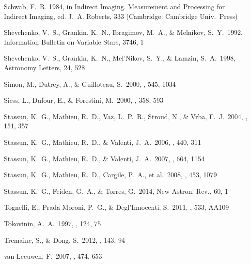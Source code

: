 \documentclass{aastex6}
\begin{document}
\begin{thebibliography}{}
{Schwab}, F.~R. 1984, in {Indirect Imaging. Measurement and Processing for
  Indirect Imaging}, ed. J.~A. {Roberts}, 333 (Cambridge: Cambridge Univ.~Press)

 Shevchenko, V.~S., 
Grankin, K.~N., Ibragimov, M.~A., 
\& Melnikov, S.~Y.\ 1992, Information Bulletin on Variable Stars, 3746, 1 

 Shevchenko, V.~S., 
Grankin, K.~N., Mel'Nikov, S.~Y., 
\& Lamzin, S.~A.\ 1998, Astronomy Letters, 24, 528 


 Simon, M., Dutrey, A., \& Guilloteau, S.\ 2000, \apj, 545, 1034

 Siess, L., Dufour, E., \& Forestini, M.\ 2000, \aap, 358, 593 

 Stassun, K.~G., 
Mathieu, R.~D., Vaz, L.~P.~R., Stroud, N., 
\& Vrba, F.~J.\ 2004, \apjs, 151, 357 

 Stassun, K.~G., 
Mathieu, R.~D., \& Valenti, J.~A.\ 2006, \nat, 440, 311 

 Stassun, K.~G., 
Mathieu, R.~D., \& Valenti, J.~A.\ 2007, \apj, 664, 1154

 Stassun, K.~G., 
Mathieu, R.~D., Cargile, P.~A., et al.\ 2008, \nat, 453, 1079 

Stassun, K.~G., Feiden, G.~A., \& Torres, G.\ 2014, New Astron. Rev., 60, 1

 Tognelli, E., Prada Moroni, P.~G., \& Degl'Innocenti, S.\ 2011, \aap, 533, AA109 

 Tokovinin, A.~A.\ 1997, \aaps, 124, 75 


 Tremaine, S., \& Dong, S.\ 2012, \aj, 143, 94

 van Leeuwen, F.\ 2007, \aap, 474, 653


\end{thebibliography}
\end{document}
